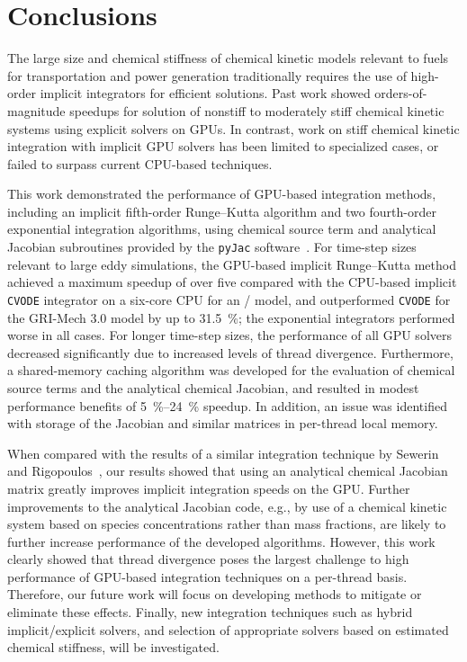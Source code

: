 \documentclass[final,twocolumn]{elsarticle}
\begin{document}
\section{Conclusions}
\label{S:conclusions}
\ifmeasure
\addvspace{10pt}
\fi

The large size and chemical stiffness of chemical kinetic models relevant to fuels for transportation and power generation traditionally requires the use of high-order implicit integrators for efficient solutions.
Past work showed orders-of-magnitude speedups for solution of nonstiff to moderately stiff chemical kinetic systems using explicit solvers on GPUs.
In contrast, work on stiff chemical kinetic integration with implicit GPU solvers has been limited to specialized cases, or failed to surpass current CPU-based techniques.

This work demonstrated the performance of GPU-based integration methods, including an implicit fifth-order Runge--Kutta algorithm and two fourth-order exponential integration algorithms, using chemical source term and analytical Jacobian subroutines provided by the \texttt{pyJac} software~\cite{Niemeyer:2015im}.
For time-step sizes relevant to large eddy simulations, the GPU-based implicit Runge--Kutta method achieved a maximum speedup of over five compared with the CPU-based implicit \texttt{CVODE} integrator on a six-core CPU for an \slash{} model, and outperformed \texttt{CVODE} for the GRI-Mech 3.0 model by up to \SI{31.5}{\percent}; the exponential integrators performed worse in all cases.
For longer time-step sizes, the performance of all GPU solvers decreased significantly due to increased levels of thread divergence.
Furthermore, a shared-memory caching algorithm was developed for the evaluation of chemical source terms and the analytical chemical Jacobian, and resulted in modest performance benefits of \SIrange{5}{24}{\percent} speedup.
In addition, an issue was identified with storage of the Jacobian and similar matrices in per-thread local memory.

When compared with the results of a similar integration technique by Sewerin and Rigopoulos~\cite{Sewerin20151375}, our results showed that using an analytical chemical Jacobian matrix greatly improves implicit integration speeds on the GPU.
Further improvements to the analytical Jacobian code, e.g., by use of a chemical kinetic system based on species concentrations rather than mass fractions, are likely to further increase performance of the developed algorithms.
However, this work clearly showed that thread divergence poses the largest challenge to high performance of GPU-based integration techniques on a per-thread basis.
Therefore, our future work will focus on developing methods to mitigate or eliminate these effects.
Finally, new integration techniques such as hybrid implicit\slash explicit solvers, and selection of appropriate solvers based on estimated chemical stiffness, will be investigated.
\end{document}
